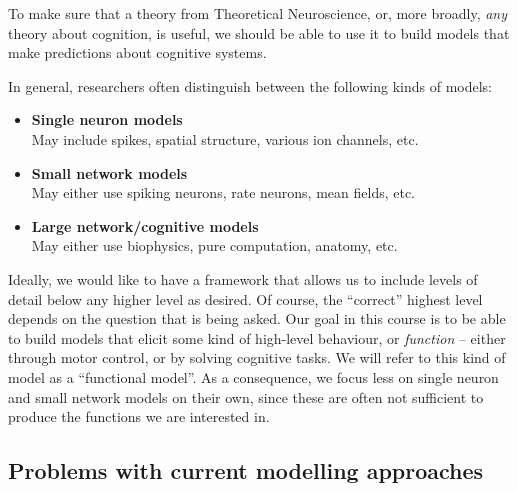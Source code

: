\documentclass[10pt,letterpaper,oneside]{article}
\begin{document}
To make sure that a theory from Theoretical Neuroscience, or, more broadly, \emph{any} theory about cognition, is useful, we should be able to use it to build models that make predictions about cognitive systems.


In general, researchers often distinguish between the following kinds of models:
\begin{itemize}
	\item \textbf{Single neuron models}\\
	May include spikes, spatial structure, various ion channels, etc.
	\item \textbf{Small network models}\\
	May either use spiking neurons, rate neurons, mean fields, etc.
	\item \textbf{Large network/cognitive models}\\
	May either use biophysics, pure computation, anatomy, etc.
\end{itemize}
Ideally, we would like to have a framework that allows us to include levels of detail below any higher level as desired. Of course, the \enquote{correct} highest level depends on the question that is being asked. Our goal in this course is to be able to build models that elicit some kind of high-level behaviour, or \emph{function} -- either through motor control, or by solving cognitive tasks. We will refer to this kind of model as a \enquote{functional model}. As a consequence, we focus less on single neuron and small network models on their own, since these are often not sufficient to produce the functions we are interested in.


\subsection{Problems with current modelling approaches}
\end{document}
